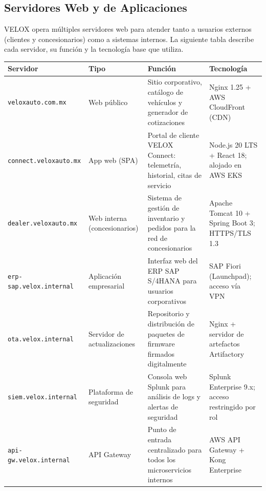 \documentclass[letterpaper,11pt]{article}
\begin{document}
\subsection{Servidores Web y de Aplicaciones}

VELOX opera múltiples servidores web para atender tanto a usuarios externos (clientes y concesionarios) como a sistemas internos. La siguiente tabla describe cada servidor, su función y la tecnología base que utiliza.

\vspace{0.2cm}
\begingroup
\small
{}
\begin{tabular}{|p{3.5cm}|p{2.8cm}|p{3.5cm}|p{3.5cm}|}
\hline
\rowcolor{green!22}
\textbf{Servidor} & \textbf{Tipo} & \textbf{Función} & \textbf{Tecnología} \\
\hline
\texttt{veloxauto.com.mx} & Web público & Sitio corporativo, catálogo de vehículos y generador de cotizaciones & Nginx 1.25 + AWS CloudFront (CDN) \\
\hline
\texttt{connect.veloxauto.mx} & App web (SPA) & Portal de cliente VELOX Connect: telemetría, historial, citas de servicio & Node.js 20 LTS + React 18; alojado en AWS EKS \\
\hline
\texttt{dealer.veloxauto.mx} & Web interna (concesionarios) & Sistema de gestión de inventario y pedidos para la red de concesionarios & Apache Tomcat 10 + Spring Boot 3; HTTPS/TLS 1.3 \\
\hline
\texttt{erp-sap.velox.internal} & Aplicación empresarial & Interfaz web del ERP SAP S/4HANA para usuarios corporativos & SAP Fiori (Launchpad); acceso vía VPN \\
\hline
\texttt{ota.velox.internal} & Servidor de actualizaciones & Repositorio y distribución de paquetes de firmware firmados digitalmente & Nginx + servidor de artefactos Artifactory \\
\hline
\texttt{siem.velox.internal} & Plataforma de seguridad & Consola web Splunk para análisis de logs y alertas de seguridad & Splunk Enterprise 9.x; acceso restringido por rol \\
\hline
\texttt{api-gw.velox.internal} & API Gateway & Punto de entrada centralizado para todos los microservicios internos & AWS API Gateway + Kong Enterprise \\
\hline
\end{tabular}
\endgroup


\end{document}
